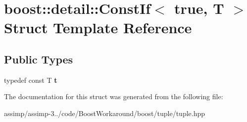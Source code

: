 \hypertarget{structboost_1_1detail_1_1_const_if_3_01true_00_01_t_01_4}{\section{boost\+:\+:detail\+:\+:Const\+If$<$ true, T $>$ Struct Template Reference}
\label{structboost_1_1detail_1_1_const_if_3_01true_00_01_t_01_4}
}
\subsection*{Public Types}
\begin{DoxyCompactItemize}
\item 
\hypertarget{structboost_1_1detail_1_1_const_if_3_01true_00_01_t_01_4_ac8167d88aff67754c90319e7350db4df}{typedef const T {\bfseries t}}\label{structboost_1_1detail_1_1_const_if_3_01true_00_01_t_01_4_ac8167d88aff67754c90319e7350db4df}

\end{DoxyCompactItemize}


The documentation for this struct was generated from the following file\+:\begin{DoxyCompactItemize}
\item 
assimp/assimp-\/3../code/\+Boost\+Workaround/boost/tuple/tuple.\+hpp\end{DoxyCompactItemize}
